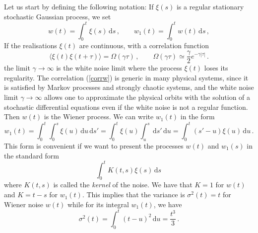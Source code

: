 Let us start by defining the following notation: If $\xi(s)$ is a regular stationary stochastic Gaussian process, we set
\begin{equation}
	w(t) = \int_0^t \xi(s)\,\mathrm{d}s \,, \qquad w_1(t)=\int_0^t w(t)\,\mathrm{d}s \,,
\end{equation}
If the realisations $\xi(t)$ are continuous, with a correlation function 
\begin{equation}
    \langle\xi(t)\xi(t+\tau)\rangle = \Omega(\gamma\tau) \,,\qquad \Omega(\gamma\tau) \simeq \frac{\gamma}{2}e^{-\gamma|\tau|}\,.
    \label{corrw}
\end{equation}
the limit $\gamma\to\infty$ is the white noise limit where the process $\xi(t)$ loses its regularity. The correlation (\ref{corrw}) is generic in many physical systems, since it is satisfied by Markov processes and strongly chaotic systems, and the white noise limit $\gamma\to\infty$ allows one to approximate the physical orbits with the solution of a stochastic differential equations even if the white noise is not a regular function. Then $w(t)$ is the Wiener process. We can write \(w_1(t)\) in the form
\begin{equation}
	w_1(t) = \int_0^t \int_0^s \xi(u)\,\mathrm{d}u\,\mathrm{d}s' = \int_0^t \xi(u)\int_u^s\,\mathrm{d}s'\,\mathrm{d}u = \int_0^t (s'-u)\xi(u)\,\mathrm{d}u \,.
\end{equation}
This form is convenient if we want to present the processes \(w(t)\) and \(w_1(s)\) in the standard form 
\begin{equation}
	\int_0^t K(t,s)\xi(s)\,\mathrm{d}s \,
\end{equation}
where \(K(t,s)\) is called the \textit{kernel} of the noise. We have that \(K=1\) for \(w(t)\) and \(K=t-s\) for \(w_1(t)\). This implies that the variance is \(\sigma^2(t) = t\) for Wiener noise \(w(t)\) while for its integral \(w_1(t)\), we have
\begin{equation}
	\sigma^2(t) = \int_0^t (t-u)^2\,\mathrm{d}u = \frac{t^3}{3} \,.
\end{equation}

